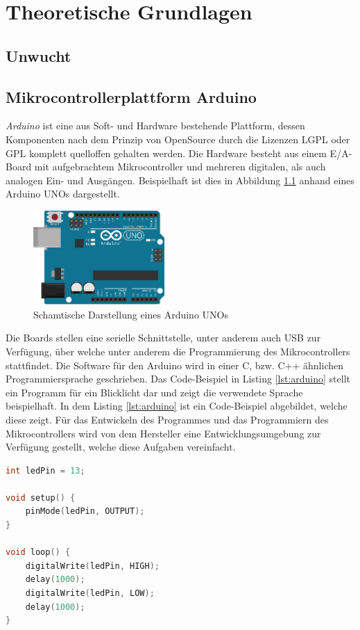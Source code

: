 
\chapter{Theoretische Grundlagen}

\section{Unwucht}

\section{Mikrocontrollerplattform Arduino}
\textit{Arduino} ist eine aus Soft- und Hardware bestehende Plattform, dessen Komponenten nach dem Prinzip von OpenSource durch die Lizenzen \ac{LGPL} oder \ac{GPL} komplett quelloffen gehalten werden.
Die Hardware besteht aus einem E/A-Board mit aufgebrachtem Mikrocontroller und mehreren digitalen, als auch analogen Ein- und Ausgängen.
Beispielhaft ist dies in Abbildung \ref{fig:arduino_uno_schema} anhand eines Arduino UNOs dargestellt.
\begin{figure}[H]
	\centering
	\includegraphics[width=5cm]{images/chapter/02/arduino_uno.png}
	\caption{Schamtische Darstellung eines Arduino UNOs}
	\label{fig:arduino_uno_schema}
\end{figure}
Die Boards stellen eine serielle Schnittstelle, unter anderem auch \ac{USB} zur Verfügung, über welche unter anderem die Programmierung des Mikrocontrollers stattfindet.
Die Software für den Arduino wird in einer C, bzw. C++ ähnlichen Programmiersprache geschrieben.
Das Code-Beispiel in Listing \ref{lst:arduino} stellt ein Programm für ein Blicklicht dar und zeigt die verwendete Sprache beispielhaft.
In dem Listing \ref{lst:arduino} ist ein Code-Beispiel abgebildet, welche diese zeigt.
Für das Entwickeln des Programmes und das Programmiern des Mikrocontrollers wird von dem Hersteller eine Entwicklungsumgebung zur Verfügung gestellt, welche diese Aufgaben vereinfacht.

\begin{lstlisting}[language=C, label={lst:arduino}, caption=Beispiel-Code eines Blinklichtes für den Arduino]
int ledPin = 13;

void setup() {
    pinMode(ledPin, OUTPUT);
}

void loop() {
    digitalWrite(ledPin, HIGH);
    delay(1000);
    digitalWrite(ledPin, LOW);
    delay(1000);
}
\end{lstlisting}

